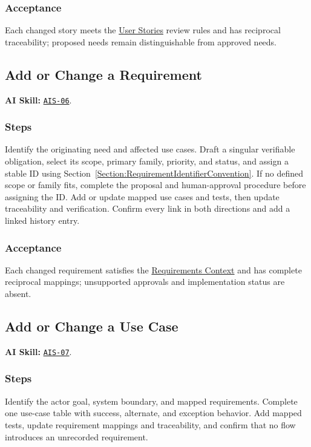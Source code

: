 \subsubsection*{Acceptance}
\label{Section:AIStoryAcceptance}
Each changed story meets the \hyperref[Chapter:UserStories]{User Stories} review rules and has reciprocal traceability; proposed needs remain distinguishable from approved needs.

\subsection{Add or Change a Requirement}
\label{Section:AIRequirementSteps}
\noindent\textbf{AI Skill:} \hyperref[Skill:AIS-06]{\texttt{AIS-06}}.

\subsubsection*{Steps}
\label{Section:AIRequirementTaskSteps}
Identify the originating need and affected use cases. Draft a singular
verifiable obligation, select its scope, primary family, priority, and status,
and assign a stable ID using
Section~\ref{Section:RequirementIdentifierConvention}. If no defined scope or
family fits, complete the proposal and human-approval procedure before
assigning the ID. Add or update mapped use cases and tests, then update
traceability and verification. Confirm every link in both directions and add a
linked history entry.

\subsubsection*{Acceptance}
\label{Section:AIRequirementAcceptance}
Each changed requirement satisfies the \hyperref[Section:AIRequirementsContext]{Requirements Context} and has complete reciprocal mappings; unsupported approvals and implementation status are absent.

\subsection{Add or Change a Use Case}
\label{Section:AIUseCaseSteps}
\noindent\textbf{AI Skill:} \hyperref[Skill:AIS-07]{\texttt{AIS-07}}.

\subsubsection*{Steps}
\label{Section:AIUseCaseTaskSteps}
Identify the actor goal, system boundary, and mapped requirements. Complete one
use-case table with success, alternate, and exception behavior. Add mapped
tests, update requirement mappings and traceability, and confirm that no flow
introduces an unrecorded requirement.

